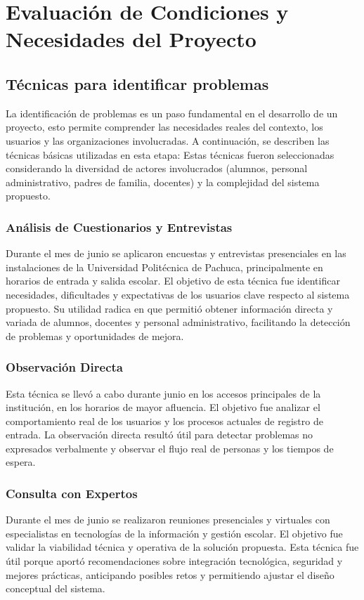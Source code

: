 \section{Evaluación de Condiciones y Necesidades del Proyecto}

\subsection{Técnicas para identificar problemas}

La identificación de problemas es un paso fundamental en el desarrollo de un proyecto, esto permite comprender las necesidades 
reales del contexto, los usuarios y las organizaciones involucradas. A continuación, se describen las técnicas básicas 
utilizadas en esta etapa: Estas técnicas fueron seleccionadas considerando la diversidad de actores involucrados 
(alumnos, personal administrativo, padres de familia, docentes) y la complejidad del sistema propuesto.

\subsubsection*{Análisis de Cuestionarios y Entrevistas}
Durante el mes de junio se aplicaron encuestas y entrevistas presenciales en las instalaciones de la
 Universidad Politécnica de Pachuca, principalmente en horarios de entrada y salida escolar. El objetivo de esta técnica 
 fue identificar necesidades, dificultades y expectativas de los usuarios clave respecto al sistema propuesto. 
 Su utilidad radica en que permitió obtener información directa y variada de alumnos, docentes y personal administrativo, 
 facilitando la detección de problemas y oportunidades de mejora.

\subsubsection*{Observación Directa}
Esta técnica se llevó a cabo durante junio en los accesos principales de la institución, en los horarios de mayor afluencia. 
El objetivo fue analizar el comportamiento real de los usuarios y los procesos actuales de registro de entrada.
 La observación directa resultó útil para detectar problemas no expresados verbalmente y observar el flujo real de personas y 
 los tiempos de espera.

\subsubsection*{Consulta con Expertos}
Durante el mes de junio se realizaron reuniones presenciales y virtuales con especialistas en tecnologías de la información 
y gestión escolar. El objetivo fue validar la viabilidad técnica y operativa de la solución propuesta. 
Esta técnica fue útil porque aportó recomendaciones sobre integración tecnológica, seguridad y
 mejores prácticas, anticipando posibles retos y permitiendo ajustar el diseño conceptual del sistema.





\setcounter{secnumdepth}{3}
\setcounter{tocdepth}{3}
